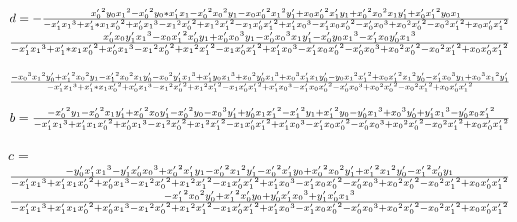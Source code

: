 \documentclass[a4paper,11pt,oneside, titlepage]{article}
\begin{document}
$d = {-{{x'_0}^2y_0{x_1}^2-{x'_0}^2y_0*{x'_1}x_1-{x'_0}^2{x_0}^2y_1-x_0{x'_0}^2{x_1}^2y'_1+x_0{x'_0}^2x'_1y_1+{x'_0}^2{x_0}^2x_1y'_1+x'_0{x'_1}^2y_0x_1\over{-x'_1{x_1}^3+x'_1*x_1{x'_0}^2+x'_0{x_1}^3-{x_1}^2{x'_0}^2+{x_1}^2{x'_1}^2-x_1x'_0{x'_1}^2+x'_1{x_0}^3-x'_1x_0{x'_0}^2-x'_0{x_0}^3+{x_0}^2{x'_0}^2-{x_0}^2{x'_1}^2+x_0x'_0{x'_1}^2}}}$\newline \newline
${{x'_0x_0y'_1{x_1}^3-x_0{x'_1}^2x'_0y_1+x'_0{x_0}^3y_1-x'_0{x_0}^3x_1y'_1-x'_0y_0{x_1}^3-x'_1x_0y'_0{x_1}^3}\over{-x'_1{x_1}^3+x'_1*x_1{x'_0}^2+x'_0{x_1}^3-{x_1}^2{x'_0}^2+{x_1}^2{x'_1}^2-x_1x'_0{x'_1}^2+x'_1{x_0}^3-x'_1x_0{x'_0}^2-x'_0{x_0}^3+{x_0}^2{x'_0}^2-{x_0}^2{x'_1}^2+x_0x'_0{x'_1}^2}}$\newline \newline

${{-{x_0}^3{x_1}^2y'_0+{x'_1}^2{x_0}^2y_1-{x'_1}^2{x_0}^2x_1y'_0-{x_0}^2y'_1{x_1}^3+x'_1y_0{x_1}^3+{x_0}^2y'_0{x_1}^3+{x_0}^3x'_1x_1y'_0-y_0{x_1}^2{x'_1}^2+x_0{x'_1}^2{x_1}^2y'_0-x'_1{x_0}^3y_1+{x_0}^3{x_1}^2y'_1}\over{-x'_1{x_1}^3+x'_1*x_1{x'_0}^2+x'_0{x_1}^3-{x_1}^2{x'_0}^2+{x_1}^2{x'_1}^2-x_1x'_0{x'_1}^2+x'_1{x_0}^3-x'_1x_0{x'_0}^2-x'_0{x_0}^3+{x_0}^2{x'_0}^2-{x_0}^2{x'_1}^2+x_0x'_0{x'_1}^2}}$\newline \newline

$b = {-{{x'_0}^2y_1-{x'_0}^2x_1y'_1+{x'_0}^2x_0y'_1-{x'_0}^2y_0-{x_0}^3y'_1+y'_0x_1{x'_1}^2-{x'_1}^2y_1+{x'_1}^2y_0-y'_0{x_1}^3+{x_0}^3y'_0+y'_1{x_1}^3-y'_0x_0{x'_1}^2}\over{-x'_1{x_1}^3+x'_1x_1{x'_0}^2+x'_0{x_1}^3-{x_1}^2{x'_0}^2+{x_1}^2{x'_1}^2-x_1x'_0{x'_1}^2+x'_1{x_0}^3-x'_1x_0{x'_0}^2-x'_0{x_0}^3+{x_0}^2{x'_0}^2-{x_0}^2{x'_1}^2+x_0x'_0{x'_1}^2}}$\newline \newline

$c = $\newline
${{-y'_0x'_1{x_1}^3-y'_1x'_0{x_0}^3+{x'_0}^2x'_1y_1-{x'_0}^2{x_1}^2y'_1-{x'_0}^2x'_1y_0+{x'_0}^2{x_0}^2y'_1+{x'_1}^2{x_1}^2y'_0-{x'_1}^2x'_0y_1}\over{-x'_1{x_1}^3+x'_1x_1{x'_0}^2+x'_0{x_1}^3-{x_1}^2{x'_0}^2+{x_1}^2{x'_1}^2-x_1x'_0{x'_1}^2+x'_1{x_0}^3-x'_1x_0{x'_0}^2-x'_0{x_0}^3+{x_0}^2{x'_0}^2-{x_0}^2{x'_1}^2+x_0x'_0{x'_1}^2}}$\newline
${{-{x'_1}^2{x_0}^2y'_0+{x'_1}^2x'_0y_0+y'_0x'_1{x_0}^3+y'_1x'_0{x_1}^3}\over{-x'_1{x_1}^3+x'_1x_1{x'_0}^2+x'_0{x_1}^3-{x_1}^2{x'_0}^2+{x_1}^2{x'_1}^2-x_1x'_0{x'_1}^2+x'_1{x_0}^3-x'_1x_0{x'_0}^2-x'_0{x_0}^3+{x_0}^2{x'_0}^2-{x_0}^2{x'_1}^2+x_0x'_0{x'_1}^2}}$\newline
\end{document}
